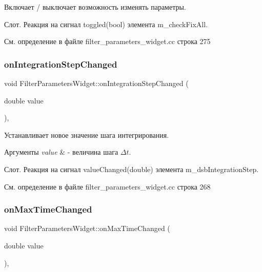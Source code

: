 Включает / выключает возможность изменять параметры. 

Слот. Реакция на сигнал toggled(bool) элемента m\+\_\+check\+Fix\+All. 

См. определение в файле filter\+\_\+parameters\+\_\+widget.\+cc строка 275

\hypertarget{class_filter_parameters_widget_a8461deaa884f5615241d6730b73f9d7b}{}\label{class_filter_parameters_widget_a8461deaa884f5615241d6730b73f9d7b} 
\subsubsection{\texorpdfstring{on\+Integration\+Step\+Changed}{onIntegrationStepChanged}}
{\footnotesize\ttfamily void Filter\+Parameters\+Widget\+::on\+Integration\+Step\+Changed (\begin{DoxyParamCaption}\item[{double}]{value }\end{DoxyParamCaption})\hspace{0.3cm}{\ttfamily [private]}, {\ttfamily [slot]}}



Устанавливает новое значение шага интегрирования. 


\begin{DoxyParams}{Аргументы}
{\em value} & -\/ величина шага $\Delta t$.\\
\hline
\end{DoxyParams}
Слот. Реакция на сигнал value\+Changed(double) элемента m\+\_\+dsb\+Integration\+Step. 

См. определение в файле filter\+\_\+parameters\+\_\+widget.\+cc строка 268

\hypertarget{class_filter_parameters_widget_a80199438a8dededc61f17d7acd0e2487}{}\label{class_filter_parameters_widget_a80199438a8dededc61f17d7acd0e2487} 
\subsubsection{\texorpdfstring{on\+Max\+Time\+Changed}{onMaxTimeChanged}}
{\footnotesize\ttfamily void Filter\+Parameters\+Widget\+::on\+Max\+Time\+Changed (\begin{DoxyParamCaption}\item[{double}]{value }\end{DoxyParamCaption})\hspace{0.3cm}{\ttfamily [private]}, {\ttfamily [slot]}}



